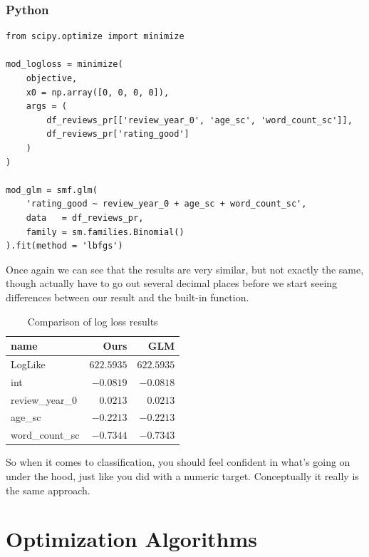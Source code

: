 \documentclass[
  letterpaper,
]{krantz}
\begin{document}
\subsubsection{Python}

\begin{verbatim}
from scipy.optimize import minimize

mod_logloss = minimize(
    objective,
    x0 = np.array([0, 0, 0, 0]),
    args = (
        df_reviews_pr[['review_year_0', 'age_sc', 'word_count_sc']], 
        df_reviews_pr['rating_good']
    )
)

mod_glm = smf.glm(
    'rating_good ~ review_year_0 + age_sc + word_count_sc',
    data   = df_reviews_pr,
    family = sm.families.Binomial()
).fit(method = 'lbfgs')
\end{verbatim}

Once again we can see that the results are very similar, but not exactly
the same, though actually have to go out several decimal places before
we start seeing differences between our result and the built-in
function.

\hypertarget{tbl-logloss}{}
\begin{longtable}{lrr}
\caption{\label{tbl-logloss}Comparison of log loss results }\tabularnewline

\toprule
name & Ours & GLM \\ 
\midrule\addlinespace[2.5pt]
LogLike & \textcolor[HTML]{404040}{$622.5935$} & \textcolor[HTML]{404040}{$622.5935$} \\ 
int & \textcolor[HTML]{404040}{$-0.0819$} & \textcolor[HTML]{404040}{$-0.0818$} \\ 
review\_year\_0 & \textcolor[HTML]{404040}{$0.0213$} & \textcolor[HTML]{404040}{$0.0213$} \\ 
age\_sc & \textcolor[HTML]{404040}{$-0.2213$} & \textcolor[HTML]{404040}{$-0.2213$} \\ 
word\_count\_sc & \textcolor[HTML]{404040}{$-0.7344$} & \textcolor[HTML]{404040}{$-0.7343$} \\ 
\bottomrule
\end{longtable}

So when it comes to classification, you should feel confident in what's
going on under the hood, just like you did with a numeric target.
Conceptually it really is the same approach.

\section{Optimization Algorithms}\label{sec-estim-opt-algos}
\end{document}
